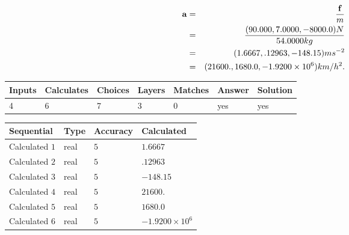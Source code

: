 \documentclass[12pt]{article}
\begin{document}
\begin{eqnarray*}
\mathbf{a}&=&\frac{\mathbf{f}}m  \\
&=&\frac{(
90.000 ,
7.0000 ,
-8000.0 )N
}{ %
54.0000 kg}  \\
&=&(
1.6667 ,
.12963,
-148.15
)ms^{-2} \\
&=&(
21600. ,
1680.0 ,
-1.9200 \times 10^{6}
)km/h^2.
\end{eqnarray*}
 
 
 
\noindent{}
 
 

 
\vspace{0.3in}
   
   
   
   
\noindent\begin{tabular}{|l|l|l|l|l|l|l|}
 \hline
Inputs & Calculates & Choices & Layers & Matches & Answer & Solution \\ \hline
           4 & 
           6 & 
           7
  & 
           3 & 
           0 & 
  yes & 
  yes 
  \\ \hline
 \end{tabular}
   
   
   
   
\noindent{}
   
   
  
  
\noindent\begin{tabular}{|l|l|l|l|}
\hline
 Sequential & Type & Accuracy & Calculated \\ 
\hline
 
 
  Calculated $           1$ & real & $           5 $ & 
 $ 1.6667 $ 
 \\  \hline  
 
 
  Calculated $           2$ & real & $           5 $ & 
 $ .12963 $ 
 \\  \hline  
 
 
  Calculated $           3$ & real & $           5 $ & 
 $ -148.15 $ 
 \\  \hline  
 
 
  Calculated $           4$ & real & $           5 $ & 
 $ 21600. $ 
 \\  \hline  
 
 
  Calculated $           5$ & real & $           5 $ & 
 $ 1680.0 $ 
 \\  \hline  
 
 
  Calculated $           6$ & real & $           5 $ & 
 $ -1.9200 \times 10^{6} $ 
 \\  \hline  
 \end{tabular}
   
\end{document}
